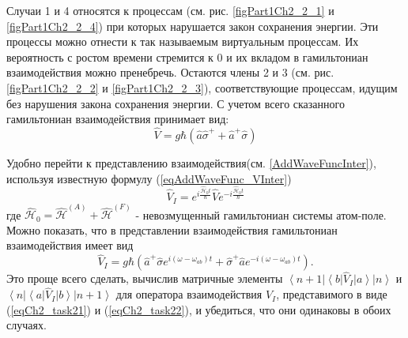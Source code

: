 Случаи 1 и 4 относятся к процессам (см. рис. \ref{figPart1Ch2_2_1} и
\ref{figPart1Ch2_2_4}) при которых нарушается закон сохранения энергии.
Эти процессы можно отнести к так называемым виртуальным процессам. Их
вероятность с ростом времени стремится к 0 и
их вкладом в гамильтониан взаимодействия можно
пренебречь. Остаются члены 2 и 3 (см. рис. \ref{figPart1Ch2_2_2} и
\ref{figPart1Ch2_2_3}), соответствующие процессам,
идущим без нарушения закона сохранения энергии. С учетом всего
сказанного гамильтониан взаимодействия принимает вид: 
\begin{equation}
\hat{V} = g \hbar \left(
\hat{a}\hat{\sigma}^{+} + 
\hat{a}^{+}\hat{\sigma}
\right)
\end{equation}

Удобно перейти к представлению взаимодействия(см. \ref{AddWaveFuncInter}),
используя известную 
формулу (\ref{eqAddWaveFunc_VInter})
\begin{equation}
\hat{V}_I = 
e^{i \frac{\hat{\mathcal{H}}_0 t}{\hbar}}
\hat{V}
e^{- i \frac{\hat{\mathcal{H}}_0 t}{\hbar}}
\label{eqCh2_task21}
\end{equation}
где 
\(
\hat{\mathcal{H}}_0 = 
\hat{\mathcal{H}}^{\left(A\right)} +
\hat{\mathcal{H}}^{\left(F\right)}
\)
- невозмущенный гамильтониан системы атом-поле. Можно показать, что в
представлении взаимодействия гамильтониан взаимодействия имеет вид 
\begin{equation}
\hat{V}_I = 
g \hbar \left(
\hat{a}^{+}\hat{\sigma} e^{i \left(\omega - \omega_{ab}\right)t} +
\hat{\sigma}^{+} \hat{a} e^{-i \left(\omega - \omega_{ab}\right)t}
\right).
\label{eqCh2_task22}
\end{equation}
Это проще всего сделать, вычислив матричные элементы 
$\left<n +
1\right|\left<b\right|\hat{V}_I\left|a\right>\left|n\right>$ и
$\left<n\right|\left<a\right|\hat{V}_I\left|b\right>\left|n +
1\right>$ для оператора взаимодействия $\hat{V}_I$, представимого в
виде (\ref{eqCh2_task21}) и (\ref{eqCh2_task22}), и убедиться, что они
одинаковы в обоих случаях.
